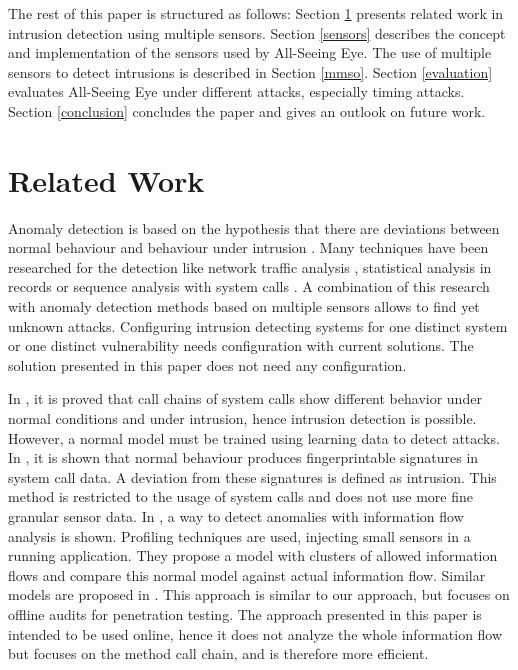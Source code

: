 \documentclass[conference]{IEEEtran}
\begin{document}
The rest of this paper is structured as follows: Section \ref{relwork} presents related work in intrusion detection using multiple sensors. Section \ref{sensors} describes the concept and implementation of the sensors used by All-Seeing Eye. The use of multiple sensors to detect intrusions is described in Section \ref{mmso}. Section \ref{evaluation} evaluates All-Seeing Eye under different attacks, especially timing attacks. Section \ref{conclusion} concludes the paper and gives an outlook on future work.

\section{Related Work}\label{relwork}

Anomaly detection is based on the hypothesis that there are deviations between normal behaviour and behaviour under intrusion \cite{patchapark2007,kruegel_anomaly_2003,liepens_intrusion_1992,denning_intrusion-detection_1987}. 
Many techniques have been researched for the detection like network traffic analysis \cite{lakhina_structural_2004,barford_signal_2002,silveira_urca:_2010}, statistical analysis in records \cite{javitz_sri_1991} or sequence analysis with system calls \cite{lee_data_1998,hofmeyr1998intrusion,forrest_sense_1996,frossi_selecting_2009}.
A combination of this research with anomaly detection methods based on multiple sensors allows to find yet unknown attacks. Configuring intrusion detecting systems for one distinct system or one distinct vulnerability needs configuration with current solutions. The solution presented in this paper does not need any configuration.

In \cite{hofmeyr1998intrusion,forrest_sense_1996}, it is proved that call chains of system calls show different behavior under normal conditions and under intrusion, hence intrusion detection is possible. However, a normal model must be trained using learning data to detect attacks. In \cite{forrest_sense_1996}, it is shown that normal behaviour produces fingerprintable signatures in system call data. 
A deviation from these signatures is defined as intrusion. This method is restricted to the usage of system calls and does not use more fine granular sensor data. In \cite{masri_application-based_2008}, a way to detect anomalies with information flow analysis is shown. Profiling techniques are used, injecting small sensors in a running application. They propose a model with clusters of allowed information flows and compare this normal model against actual information flow. Similar models are proposed in \cite{feng_predicting_2004,bhatkar_dataflow_2006,qin_lift:_2006}. This approach is similar to our approach, but \cite{masri_application-based_2008} focuses on offline audits for penetration testing. The approach presented in this paper is intended to be used online, hence it does not analyze the whole information flow but focuses on the method call chain, and is therefore more efficient.
\end{document}
